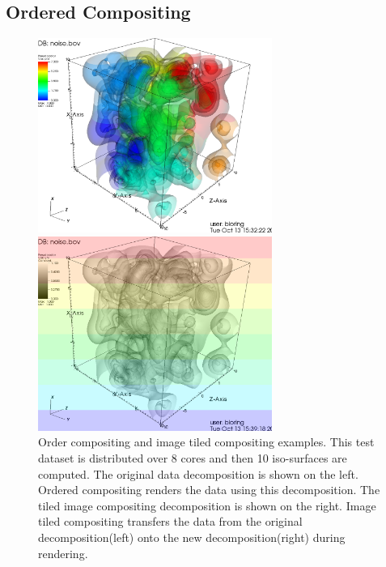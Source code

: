 \documentclass[a4paper,10pt]{report}
\begin{document}
\subsection{Ordered Compositing}
\begin{figure}
 \centering
 \begin{minipage}{0.48\textwidth}
 \begin{center}
 \includegraphics[height=2.5in]{./order_composite_example_color.png}
\end{center}

  \end{minipage}
  \begin{minipage}{0.48\textwidth}
\begin{center}
 \includegraphics[height=2.5in]{./tiled_image_example_color.png}
\end{center}
  \end{minipage}
 \caption{Order compositing and image tiled compositing examples. This test dataset is distributed over 8 cores and then 10 iso-surfaces are computed. The original data decomposition is shown on the left. Ordered compositing renders the data using this decomposition. The tiled image compositing decomposition is shown on the right. Image tiled compositing transfers the data from the original decomposition(left) onto the new decomposition(right) during rendering.}
 \label{fig:vpic_data}
\end{figure}
\end{document}
